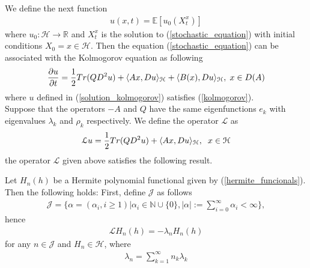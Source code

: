    	\noindent We define the next function
   	\begin{align}
   		u(x, t) = \mathbb{E} \left[ u_0 (X^x_t) \right] 
   		\label{solution_kolmogorov}
   	\end{align}
   	where $u_0 : \mathcal{H} \rightarrow \mathbb{R}$ and $X_t^x$ is the solution to (\ref{stochastic_equation}) with initial conditions $X_0 = x \in \mathcal{H}$. Then 
   	the equation (\ref{stochastic_equation}) can be associated with the Kolmogorov equation as following
   	\begin{align}
   		\label{kolmogorov}
    	\frac{\partial u}{\partial t} = \frac{1}{2} Tr(QD^2 u) + \langle Ax, Du\rangle_{\mathcal{H}} + \langle B(x), Du\rangle_{\mathcal{H}}, \hspace{0.1cm} x \in D(A)
   	\end{align}
   	where $u$ defined in (\ref{solution_kolmogorov}) satisfies (\ref{kolmogorov}). \\
   	 
   	\noindent Suppose that the operators $-A$ and $Q$ have the same eigenfunctions $e_k$ with eigenvalues $\lambda_k$ and $\rho_k$ respectively. We define the operator $\mathcal{L}$ as
   	\begin{align}
   	\label{operator_L}
   		\mathcal{L} u = \frac{1}{2} Tr(QD^2 u) + \langle Ax, Du\rangle_{\mathcal{H}}, \hspace{2mm} x \in \mathcal{H}
   	\end{align}
   	the operator $\mathcal{L}$ given above satisfies the following result.
   	\begin{lemma}
   	\label{eigen}
   		Let $H_n (h)$ be a Hermite polynomial functional given by (\ref{hermite_funcionals}). Then
   		the following holds: First, define $\mathcal{J}$ as follows
   		\begin{align*}
   			\mathcal{J} = \{\alpha = (\alpha_i,i \geq 1) | \alpha_i \in \mathbb{N}\cup \{0\}, |\alpha|:= \displaystyle \sum _{i = 0}^{\infty}\alpha_i < \infty\},
   		\end{align*}
   		hence
   		\begin{align}
   			\label{eigen_lambda_kolmo}
   			\mathcal{L} H_n (h) = - \lambda_n H_n (h)
   		\end{align}
   		for any $n \in \mathcal{J}$ and $H_n \in \mathcal{H}$, where
   		\begin{align*}
   			\lambda_n = \displaystyle \sum_{k=1}^{\infty} n_k \lambda_k
   		\end{align*}
   	\end{lemma}
   
